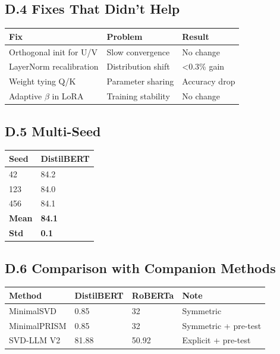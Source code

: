 \subsection{D.4 Fixes That Didn't Help}

\begin{table}[H]
\centering
\small
\begin{tabular}{lll}
\toprule
\textbf{Fix} & \textbf{Problem} & \textbf{Result} \\
\midrule
Orthogonal init for U/V & Slow convergence & No change \\
LayerNorm recalibration & Distribution shift & \textless{}0.3\% gain \\
Weight tying Q/K & Parameter sharing & Accuracy drop \\
Adaptive $\beta$ in LoRA & Training stability & No change \\
\bottomrule
\end{tabular}
\end{table}

\subsection{D.5 Multi-Seed}

\begin{table}[H]
\centering
\small
\begin{tabular}{ll}
\toprule
\textbf{Seed} & \textbf{DistilBERT} \\
\midrule
42 & 84.2 \\
123 & 84.0 \\
456 & 84.1 \\
\textbf{Mean} & \textbf{84.1} \\
\textbf{Std} & \textbf{0.1} \\
\bottomrule
\end{tabular}
\end{table}

\subsection{D.6 Comparison with Companion Methods}

\begin{table}[H]
\centering
\small
\begin{tabular}{llll}
\toprule
\textbf{Method} & \textbf{DistilBERT} & \textbf{RoBERTa} & \textbf{Note} \\
\midrule
MinimalSVD & 0.85 & 32 & Symmetric \\
MinimalPRISM & 0.85 & 32 & Symmetric + pre-test \\
SVD-LLM V2 & 81.88 & 50.92 & Explicit + pre-test \\
\bottomrule
\end{tabular}
\end{table}


